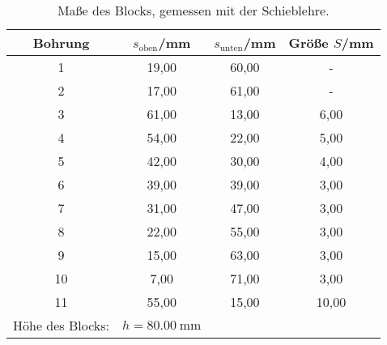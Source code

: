 \begin{table}[H]
  \centering
  \caption{Maße des Blocks, gemessen mit der Schieblehre.}
  \label{tab:tab0}
    \begin{tabular}{c c c c }
    \toprule
    Bohrung & $s_{\text{oben}}$/\;mm & $s_{\text{unten}}$/\;mm & Größe $S$/\;mm\\
    \midrule
    1 & 19,00 & 60,00 & -\\
    2 & 17,00 & 61,00 & -\\
    3 & 61,00 & 13,00 & 6,00\\
    4& 54,00  & 22,00 & 5,00\\
    5 & 42,00 & 30,00 & 4,00\\
    6 & 39,00 & 39,00 & 3,00\\
    7& 31,00 & 47,00 & 3,00\\
    8 & 22,00 & 55,00 & 3,00\\
    9 & 15,00 & 63,00 & 3,00\\
    10 & 7,00 & 71,00 & 3,00\\
    11 & 55,00 & 15,00 & 10,00\\
    \bottomrule
    Höhe des Blocks:& $h=\SI{80,00}{\mm}$
    \end{tabular}
  \end{table}
